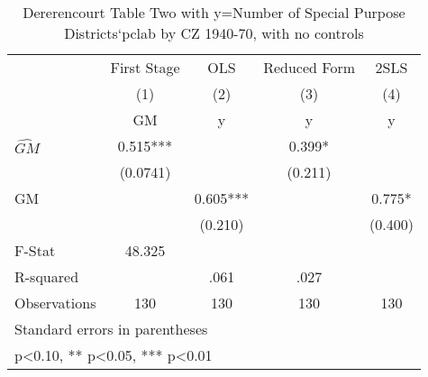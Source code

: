 \begin{table}[htbp]\centering
\def\sym#1{\ifmmode^{#1}\else\(^{#1}\)\fi}
\caption{Dererencourt Table Two with y=Number of Special Purpose Districts`pclab by CZ 1940-70, with no controls}
\begin{tabular}{l*{4}{c}}
\toprule
                    & First Stage   &         OLS   &Reduced Form   &        2SLS   \\
                    &\multicolumn{1}{c}{(1)}&\multicolumn{1}{c}{(2)}&\multicolumn{1}{c}{(3)}&\multicolumn{1}{c}{(4)}\\
                    &\multicolumn{1}{c}{GM}&\multicolumn{1}{c}{y}&\multicolumn{1}{c}{y}&\multicolumn{1}{c}{y}\\
\midrule
$\hat{GM}$          &       0.515***&               &       0.399*  &               \\
                    &    (0.0741)   &               &     (0.211)   &               \\
\addlinespace
GM                  &               &       0.605***&               &       0.775*  \\
                    &               &     (0.210)   &               &     (0.400)   \\
\midrule
F-Stat              &      48.325   &               &               &               \\
R-squared           &               &        .061   &        .027   &               \\
Observations        &         130   &         130   &         130   &         130   \\
\bottomrule
\multicolumn{5}{l}{\footnotesize Standard errors in parentheses}\\
\multicolumn{5}{l}{\footnotesize * p<0.10, ** p<0.05, *** p<0.01}\\
\end{tabular}
\end{table}
